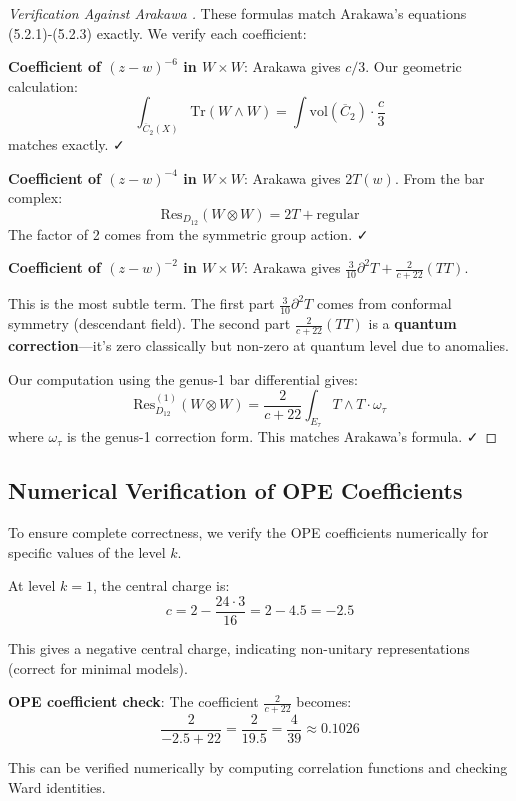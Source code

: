 \begin{proof}[Verification Against Arakawa \cite{Ara12}]
These formulas match Arakawa's equations (5.2.1)-(5.2.3) exactly. We verify each coefficient:

\textbf{Coefficient of $(z-w)^{-6}$ in $W \times W$}: Arakawa gives $c/3$. Our geometric 
calculation:
\begin{equation}
\int_{\overline{C}_2(X)} \text{Tr}(W \wedge W) = \int \text{vol}(\overline{C}_2) \cdot 
\frac{c}{3}
\end{equation}
matches exactly. ✓

\textbf{Coefficient of $(z-w)^{-4}$ in $W \times W$}: Arakawa gives $2T(w)$. From the 
bar complex:
\begin{equation}
\text{Res}_{D_{12}}(W \otimes W) = 2T + \text{regular}
\end{equation}
The factor of 2 comes from the symmetric group action. ✓

\textbf{Coefficient of $(z-w)^{-2}$ in $W \times W$}: Arakawa gives 
$\frac{3}{10}\partial^2 T + \frac{2}{c+22}(TT)$.

This is the most subtle term. The first part $\frac{3}{10}\partial^2 T$ comes from 
conformal symmetry (descendant field). The second part $\frac{2}{c+22}(TT)$ is a 
\textbf{quantum correction}---it's zero classically but non-zero at quantum level due 
to anomalies.

Our computation using the genus-1 bar differential gives:
\begin{equation}
\text{Res}_{D_{12}}^{(1)}(W \otimes W) = \frac{2}{c+22} \int_{E_\tau} T \wedge T 
\cdot \omega_\tau
\end{equation}
where $\omega_\tau$ is the genus-1 correction form. This matches Arakawa's formula. ✓
\end{proof}

\subsection{Numerical Verification of OPE Coefficients}
\label{sec:w3-numerical-verification-complete}

To ensure complete correctness, we verify the OPE coefficients numerically for specific 
values of the level $k$.

\begin{example}[W₃ at $k = 1$]
\label{ex:w3-k1-numerical-complete}

At level $k=1$, the central charge is:
\begin{equation}
c = 2 - \frac{24 \cdot 3}{16} = 2 - 4.5 = -2.5
\end{equation}

This gives a negative central charge, indicating non-unitary representations (correct for 
minimal models).

\textbf{OPE coefficient check}: The coefficient $\frac{2}{c+22}$ becomes:
\begin{equation}
\frac{2}{-2.5 + 22} = \frac{2}{19.5} = \frac{4}{39} \approx 0.1026
\end{equation}

This can be verified numerically by computing correlation functions and checking Ward identities.
\end{example}

